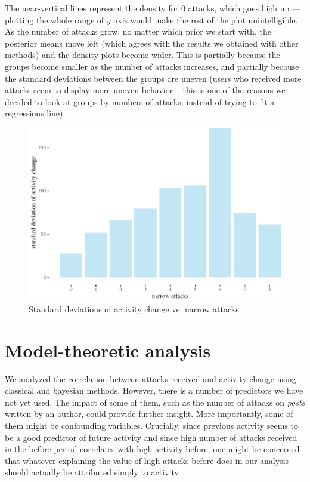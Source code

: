 \documentclass[10pt,]{scrartcl}
\begin{document}
\normalsize

The near-vertical lines represent the density for 0 attacks, which goes
high up --- plotting the whole range of \(y\) axis would make the rest
of the plot unintelligible. As the number of attacks grow, no matter
which prior we start with, the posterior means move left (which agrees
with the results we obtained with other methods) and the density plots
become wider. This is partially because the groups become smaller as the
number of attacks increases, and partially because the standard
deviations between the groups are uneven (users who received more
attacks seem to display more uneven behavior -- this is one of the
reasons we decided to look at groups by numbers of attacks, instead of
trying to fit a regressions line).

\begin{figure}[!ht]

\begin{center}\includegraphics[width=1\linewidth]{redditAnalysisWalkthrough_files/figure-latex/unnamed-chunk-63-1} \end{center}
\caption{Standard deviations of  activity change vs. narrow attacks.}
\label{fig:bayesian3'}
\end{figure}

\section{Model-theoretic analysis}

\normalsize

We analyzed the correlation between attacks received and activity change
using classical and bayesian methods. However, there is a number of
predictors we have not yet used. The impact of some of them, such as the
number of attacks on \emph{posts} written by an author, could provide
further insight. More importantly, some of them might be confounding
variables. Crucially, since previous activity seems to be a good
predictor of future activity and since high number of attacks received
in the \textsf{before} period correlates with high activity before, one
might be concerned that whatever explaining the value of high attacks
before does in our analysis should actually be attributed simply to
activity.
\end{document}
